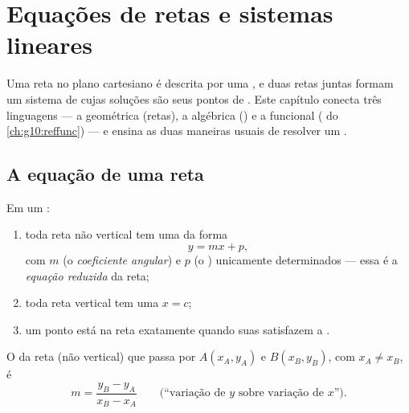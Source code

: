 \chapter{Equações de retas e sistemas lineares}\label{ch:g10:lines}

Uma reta no plano cartesiano é descrita por uma , e duas retas
juntas formam um sistema de  cujas soluções são seus pontos de
. Este capítulo conecta três linguagens --- a geométrica
(retas), a algébrica () e a funcional ( do
\cref{ch:g10:reffunc}) --- e ensina as duas maneiras usuais de resolver um
.

\section{A equação de uma reta}

\begin{theorem}\label{thm:g10:lines:reduced}
Em um :
\begin{enumerate}
  \item toda reta não vertical tem uma  da forma
        \[
        y = mx + p ,
        \]
        com $m$ (o \emph{coeficiente angular})
        e $p$ (o \emph{}) unicamente determinados ---
        essa é a \emph{equação reduzida} da reta;
  \item toda reta vertical tem uma  $x = c$;
  \item um ponto está na reta exatamente quando suas 
        satisfazem a .
\end{enumerate}
\end{theorem}
\admitted

\begin{proposition}\label{prop:g10:lines:slope}
O  da reta (não vertical) que passa por
$A(x_A, y_A)$ e $B(x_B, y_B)$, com $x_A \neq x_B$, é
\[
m = \frac{y_B - y_A}{x_B - x_A}
\qquad
\text{(``variação de $y$ sobre variação de $x$'').}
\]
\end{proposition}

